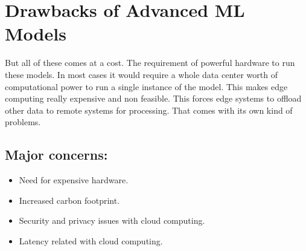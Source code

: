 \documentclass[../../main]{subfiles}
\begin{document}
\section{Drawbacks of Advanced ML Models} \label{sec:}

But all of these comes at a cost. The requirement of powerful
hardware to run these models. In most cases it would require a whole
data center worth of computational power to run a single instance of
the model. This makes edge computing really expensive and non feasible.
This forces edge systems to offload other data to remote systems for
processing. That comes with its own kind of problems.

\subsection{Major concerns:}

\begin{itemize}
    \item Need for expensive hardware.
    \item Increased carbon footprint.
    \item Security and privacy issues with cloud computing.
    \item Latency related with cloud computing.
\end{itemize}
\end{document}
